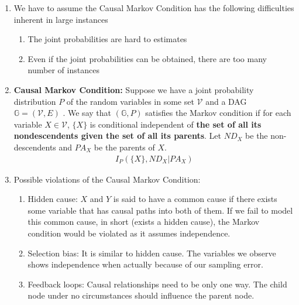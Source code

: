 \documentclass[12pt,twoside]{article}
\begin{document}
\begin{enumerate}

\item We have to assume the Causal Markov Condition has the following difficulties inherent in large instances 
\begin{enumerate}
\item The joint probabilities are hard to estimates
\item Even if the joint probabilities can be obtained, there are too many number of instances
\end{enumerate}

\item \textbf{Causal Markov Condition:} Suppose we have a joint probability distribution $P$ of the random variables in some set $\mathcal{V}$ and a DAG $\mathbb{G}=(\mathcal{V}, E)$ . We say that $(\mathbb{G}, P)$ satisfies the Markov condition if for each variable $X\in \mathcal{V}$, $\lbrace X \rbrace$ is conditional independent of \textbf{the set of all its nondescendents given the set of all its parents}. Let $ND_X$ be the non-descendents and $PA_X$ be the parents of $X$. 
\begin{align*}
I_P(\lbrace X \rbrace, ND_X \vert PA_X)
\end{align*}

\item Possible violations of the Causal Markov Condition:
\begin{enumerate}
\item Hidden cause: $X$ and $Y$ is said to have a common cause if there exists some variable that has causal paths into both of them. If we fail to model this common cause, in short (exists a hidden cause), the Markov condition would be violated as it assumes independence.
\item Selection bias: It is similar to hidden cause. The variables we observe shows independence when actually because of our sampling error.
\item Feedback loops: Causal relationships need to be only one way. The child node under no circumstances should influence the parent node.
\end{enumerate}


\end{enumerate}
\end{document}
